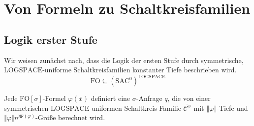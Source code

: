 
\chapter{Von Formeln zu Schaltkreisfamilien}

\section{Logik erster Stufe}

Wir weisen zunächst nach, dass die Logik der ersten Stufe durch symmetrische,
$\mathrm{LOGSPACE}$-uniforme Schaltkreisfamilien konstanter Tiefe
beschrieben wird. 
\[
\mathrm{FO}\subseteq\left(\mathrm{SAC}^{0}\right)^{\mathrm{LOGSPACE}}
\]

\begin{lem}
\label{lem:fo-circuit}Jede $\mathrm{FO}\left[\sigma\right]$-Formel
$\varphi\left(\bar{x}\right)$ definiert eine $\sigma$-Anfrage $q$,
die von einer symmetrischen $\mathrm{LOGSPACE}$-uniformen Schaltkreis-Familie
$\bar{\mathcal{C}^{\varphi}}$ mit $\left\Vert \varphi\right\Vert $-Tiefe
und $\left\Vert \varphi\right\Vert n^{\mathtt{MF}\left(\varphi\right)}$-Größe
berechnet wird.
\end{lem}
